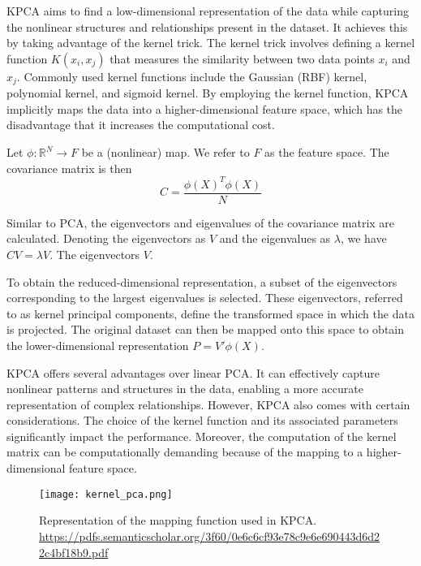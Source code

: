 KPCA aims to find a low-dimensional representation of the data while capturing the nonlinear structures and relationships present in the dataset. It achieves this by taking advantage of the kernel trick. The kernel trick involves defining a kernel function $K(x_i, x_j)$ that measures the similarity between two data points $x_i$ and $x_j$. Commonly used kernel functions include the Gaussian (RBF) kernel, polynomial kernel, and sigmoid kernel. By employing the kernel function, KPCA implicitly maps the data into a higher-dimensional feature space, which has the disadvantage that it increases the computational cost.

Let $\phi : \mathbb{R}^N \rightarrow F$ be a (nonlinear) map. We refer to $F$ as the feature space. The covariance matrix is then
\begin{equation}
    C = \frac{\phi(X)^T \phi(X)}{N}
\end{equation}

Similar to PCA, the eigenvectors and eigenvalues of the covariance matrix are calculated. Denoting the eigenvectors as $V$ and the eigenvalues as $\lambda$, we have $C V = \lambda V$. The eigenvectors $V$.

To obtain the reduced-dimensional representation, a subset of the eigenvectors corresponding to the largest eigenvalues is selected. These eigenvectors, referred to as kernel principal components, define the transformed space in which the data is projected. The original dataset can then be mapped onto this space to obtain the lower-dimensional representation $P = V' \phi(X)$.

KPCA offers several advantages over linear PCA. It can effectively capture nonlinear patterns and structures in the data, enabling a more accurate representation of complex relationships.
However, KPCA also comes with certain considerations. The choice of the kernel function and its associated parameters significantly impact the performance. Moreover, the computation of the kernel matrix can be computationally demanding because of the mapping to a higher-dimensional feature space.

\begin{figure}
    \centering
    \texttt{[image: kernel\_pca.png]}
    \caption{Representation of the mapping function used in KPCA. \url{https://pdfs.semanticscholar.org/3f60/0e6c6cf93e78c9e6e690443d6d22c4bf18b9.pdf}}
    \label{fig:kernel_pca}
\end{figure}

